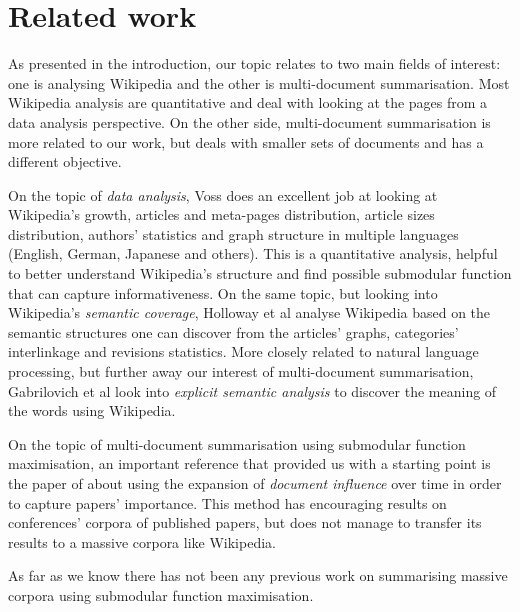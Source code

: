 \chapter{Related work}

As presented in the introduction, our topic relates to two main fields of
interest: one is analysing Wikipedia and the other is multi-document
summarisation. Most Wikipedia analysis are quantitative and deal with looking
at the pages from a data analysis perspective. On the other side,
multi-document summarisation is more related to our work, but deals with
smaller sets of documents and has a different objective.

On the topic of \emph{data analysis}, Voss \cite{voss2005measuring} does an
excellent job at looking at Wikipedia's growth, articles and meta-pages
distribution, article sizes distribution, authors' statistics and graph
structure in multiple languages (English, German, Japanese and others). This is
a quantitative analysis, helpful to better understand Wikipedia's structure and
find possible submodular function that can capture informativeness.
On the same topic, but looking into Wikipedia's \emph{semantic coverage},
Holloway et al \cite{holloway2007analyzing} analyse Wikipedia based on the
semantic structures one can discover from the articles' graphs, categories'
interlinkage and revisions statistics.
More closely related to natural language processing, but further away our
interest of multi-document summarisation, Gabrilovich et al
\cite{gabrilovich2007computing} look into \emph{explicit semantic analysis} to
discover the meaning of the words using Wikipedia.

On the topic of multi-document summarisation using submodular function
maximisation, an important reference that provided us with a starting point is
the paper of \cite{sipos2012temporal} about using the expansion of
\emph{document influence} over time in order to capture papers' importance.
This method has encouraging results on conferences' corpora of published
papers, but does not manage to transfer its results to a massive corpora like
Wikipedia.

As far as we know there has not been any previous work on summarising massive
corpora using submodular function maximisation.

